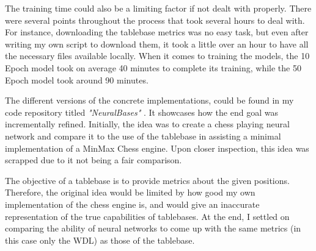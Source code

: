 The training time could also be a limiting factor if not dealt with properly. There were several points throughout the process that took several hours to deal with. For instance, downloading the tablebase metrics was no easy task, but even after writing my own script \cite{NeuralBases} to download them, it took a little over an hour to have all the necessary files available locally. When it comes to training the models, the 10 Epoch model took on average 40 minutes to complete its training, while the 50 Epoch model took around 90 minutes.

The different versions of the concrete implementations, could be found in my code repository titled \textit{"NeuralBases"} \cite{NeuralBases}. It showcases how the end goal was incrementally refined. Initially, the idea was to create a chess playing neural network and compare it to the use of the tablebase in assisting a minimal implementation of a MinMax Chess engine. Upon closer inspection, this idea was scrapped due to it not being a fair comparison.

The objective of a tablebase is to provide metrics about the given positions. Therefore, the original idea would be limited by how good my own implementation of the chess engine is, and would give an inaccurate representation of the true capabilities of tablebases. At the end, I settled on comparing the ability of neural networks to come up with the same metrics (in this case only the WDL) as those of the tablebase.


